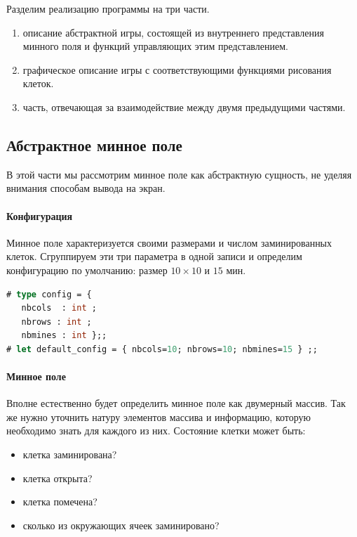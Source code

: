 Разделим реализацию программы на три части.
\begin{enumerate}
	\item описание абстрактной игры, состоящей из внутреннего представления 
минного поля и функций управляющих этим представлением.

	\item графическое описание игры с соответствующими функциями рисования 
клеток.

	\item часть, отвечающая за взаимодействие между двумя предыдущими частями. 
\end{enumerate}

\subsection{Абстрактное минное поле}
\label{subsec:the_abstract_mine_field}

В этой части мы рассмотрим минное поле как абстрактную сущность, не уделяя 
внимания способам вывода на экран.

\paragraph{Конфигурация}

Минное поле характеризуется своими размерами и числом заминированных клеток. 
Сгруппируем эти три параметра в одной записи и определим конфигурацию по 
умолчанию: размер $10 \times 10$ и $15$ мин.

\begin{lstlisting}[language=OCaml]
# type config = { 
   nbcols  : int ;
   nbrows : int ; 
   nbmines : int };;
# let default_config = { nbcols=10; nbrows=10; nbmines=15 } ;;
\end{lstlisting}

\paragraph{Минное поле}

Вполне естественно будет определить минное поле как двумерный массив. Так же 
нужно уточнить натуру элементов массива и информацию, которую необходимо знать 
для каждого из них. Состояние клетки может быть: 

\begin{itemize}
	\item клетка заминирована?

	\item клетка открыта?

	\item клетка помечена?

	\item сколько из окружающих ячеек заминировано? 
\end{itemize}


